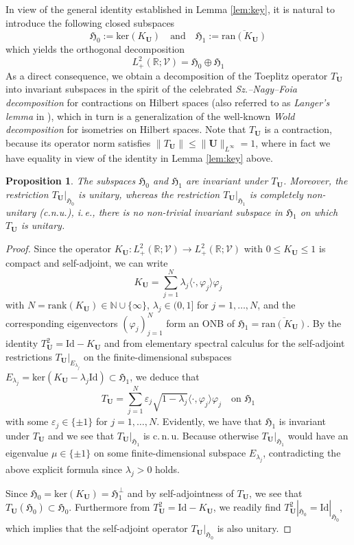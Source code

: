 \documentclass[11pt,reqno]{amsart}
\newtheorem{prop}{Proposition}[section]
\theoremstyle{definition}
\theoremstyle{remark}
\theoremstyle{remark}
\numberwithin{equation}{section}
\newcommand{\Hfr}{\mathfrak{H}}
\newcommand{\N}{\mathbb{N}}
\newcommand{\R}{\mathbb{R}}
\newcommand{\VV}{\mathcal{V}}
\newcommand{\ov}{\overline}
\newcommand{\ran}{\mathrm{ran}}
\renewcommand{\ker}{\mathrm{ker}}
\newcommand{\rank}{\mathrm{rank}}
\newcommand{\be}{\begin{equation}}
\newcommand{\ee}{\end{equation}}
\newcommand{\eps}{\varepsilon}
\newcommand{\Ub}{\mathbf{U}}
\newcommand{\id}{\mathrm{Id}}
\renewcommand{\phi}{\varphi}
\begin{document}
In view of the general identity established in Lemma \ref{lem:key}, it is natural to introduce the following closed subspaces
\be
\boxed {\Hfr_0 := \ker(K_{\Ub}) \quad \mbox{and} \quad \Hfr_1 := \ov{\ran(K_{\Ub})}  }
\ee
which yields the orthogonal decomposition
\be
\boxed{L^2_+(\R; \VV) = \Hfr_0 \oplus \Hfr_1 }
\ee
As a direct consequence,  we obtain a decomposition of the Toeplitz operator $T_{\Ub}$ into invariant subspaces in the spirit of the celebrated {\em Sz.--Nagy--Foia decomposition} for contractions on Hilbert spaces  \cite{SzFoBeKe-10} (also referred to as {\em Langer's lemma} in \cite{La-61}), which in turn is a generalization of the well-known {\em Wold decomposition} for isometries on Hilbert spaces. Note that $T_{\Ub}$ is a contraction, because its operator norm satisfies $\|T_{\Ub}\| \leq \| \Ub \|_{L^\infty} = 1$, where in fact we have equality in view of the identity in Lemma \ref{lem:key} above.

\begin{prop} \label{prop:nagy}
The subspaces $\Hfr_0$ and $\Hfr_1$ are invariant under $T_{\Ub}$. Moreover, the restriction $T_{\Ub} |_{\Hfr_0}$ is unitary, whereas the restriction $T_{\Ub} |_{\Hfr_1}$ is completely non-unitary (c.n.u.), i.\,e., there is no non-trivial invariant subspace in $\Hfr_1$ on which $T_{\Ub}$ is unitary.
\end{prop} 

\begin{proof}
Since the operator $K_\Ub : L^2_+(\R; \VV) \to L^2_+(\R; \VV)$ with $0 \leq K_\Ub \leq 1$ is compact and self-adjoint, we can write
$$
K_\Ub = \sum_{j=1}^N \lambda_j \langle \cdot, \phi_j\rangle  \phi_j
$$
with $N = \rank(K_\Ub) \in \N \cup \{\infty\}$, $\lambda_j \in (0, 1]$ for $j=1, \ldots, N$, and the corresponding eigenvectors $(\phi_j)_{j=1}^N$ form an ONB of $\Hfr_1 = \ov{\ran(K_\Ub)}$. By the identity $T_\Ub^2 = \id - K_\Ub$ and from elementary spectral calculus for the self-adjoint restrictions $T_\Ub |_{E_{\lambda_j}}$ on the finite-dimensional subspaces $E_{\lambda_j}=\ker(K_\Ub-\lambda_j \id) \subset \Hfr_1$, we deduce that
\be \label{eq:T_U_spectral}
T_\Ub = \sum_{j=1}^N \eps_j \sqrt{1- \lambda_j} \langle \cdot, \phi_j \rangle \phi_j \quad \mbox{on $\Hfr_1$} 
\ee
with some $\eps_j \in \{ \pm 1 \}$ for $j=1, \ldots, N$. Evidently, we have that $\Hfr_1$ is invariant under $T_\Ub$ and we see that $T_\Ub |_{\Hfr_1}$ is c.\,n.\,u. Because otherwise $T_\Ub |_{\Hfr_1}$ would have an eigenvalue $\mu \in \{ \pm 1\}$ on some finite-dimensional subspace $E_{\lambda_j}$, contradicting the above explicit formula since $\lambda_j > 0$ holds.


Since $\Hfr_0 = \ker(K_\Ub) = \Hfr_1^\perp$ and by self-adjointness of $T_\Ub$, we see that $T_\Ub(\Hfr_0) \subset \Hfr_0$. Furthermore from $T_\Ub^2 = \id - K_\Ub$, we readily find
$T^2_{\Ub} |_{\Hfr_0} = \id |_{\Hfr_0}$, which implies that the self-adjoint operator $T_\Ub |_{\Hfr_0}$ is also unitary.
\end{proof}
\end{document}
